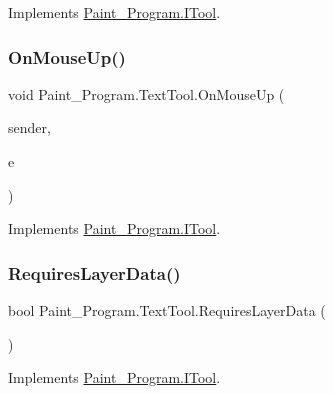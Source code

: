 Implements \mbox{\hyperlink{interface_paint___program_1_1_i_tool_a6a1cbe840b5cfc8a9b9463cc21590845}{Paint\+\_\+\+Program.\+I\+Tool}}.

\mbox{\label{class_paint___program_1_1_text_tool_a0b77db4478e19cd1f957c37af981fbf5}} 
\subsubsection{\texorpdfstring{On\+Mouse\+Up()}{OnMouseUp()}}
{\footnotesize\ttfamily void Paint\+\_\+\+Program.\+Text\+Tool.\+On\+Mouse\+Up (\begin{DoxyParamCaption}\item[{object}]{sender,  }\item[{Mouse\+Event\+Args}]{e }\end{DoxyParamCaption})\hspace{0.3cm}{\ttfamily [inline]}}



Implements \mbox{\hyperlink{interface_paint___program_1_1_i_tool_a47984c2879213022f1684c07f7bba73e}{Paint\+\_\+\+Program.\+I\+Tool}}.

\mbox{\label{class_paint___program_1_1_text_tool_a6fdb8fac7060beb3677489c709a7913f}} 
\subsubsection{\texorpdfstring{Requires\+Layer\+Data()}{RequiresLayerData()}}
{\footnotesize\ttfamily bool Paint\+\_\+\+Program.\+Text\+Tool.\+Requires\+Layer\+Data (\begin{DoxyParamCaption}{ }\end{DoxyParamCaption})\hspace{0.3cm}{\ttfamily [inline]}}



Implements \mbox{\hyperlink{interface_paint___program_1_1_i_tool_a6d45b6c48da8130ae41db3a66cdaef9a}{Paint\+\_\+\+Program.\+I\+Tool}}.

